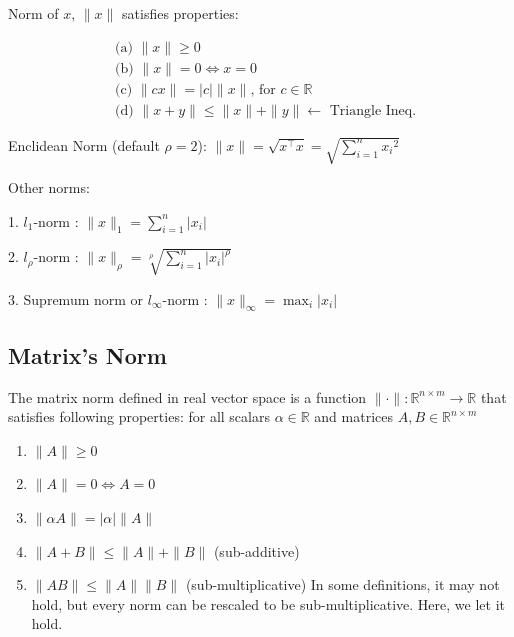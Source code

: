 \documentclass[11pt]{elegantbook}
\begin{document}
Norm of $x$, $\|x\|$ satisfies properties:

$$
\begin{aligned}
&\text { (a) }\|x\| \geqslant 0 \\
&\text { (b) }\|x\|=0 \Leftrightarrow x=0 \\
&\text { (c) }\|c x\|=|c|\|x\| \text {, for } c \in \mathbb{R} \\
&\text { (d) }\|x+y\| \leqslant\|x\|+\|y\| \longleftarrow \text { Triangle Ineq. }
\end{aligned}
$$

Enclidean Norm (default $\rho=2$): $\|x\|=\sqrt{x^{\top} x}=\sqrt{\sum_{i=1}^{n} x_{i}{ }^{2}}$

Other norms:

1. $l_{1}$-norm : $\|x\|_{1}=\sum_{i=1}^{n}\left|x_{i}\right|$

2. $l_{\rho}$-norm : $\|x\|_{\rho}=\sqrt[\rho]{\sum_{i=1}^{n}\left|x_{i}\right|^\rho}$

3. Supremum norm or $l_{\infty}$-norm : $\|x\|_{\infty}=\max _{i}\left|x_{i}\right|$


\subsection{Matrix's Norm}
\begin{definition}
\normalfont
    The matrix norm defined in real vector space is a function $\|\cdot\|: \mathbb{R}^{n\times m} \rightarrow \mathbb{R}$ that satisfies following properties: for all scalars $\alpha\in \mathbb{R}$ and matrices $A,B\in \mathbb{R}^{n\times m}$
    \begin{enumerate}[(1).]
        \item $\|A\|\geq 0$
        \item $\|A\|=0 \Leftrightarrow A=0$
        \item $\|\alpha A\|=|\alpha|\|A\|$
        \item $\|A+B\|\leq\|A\|+\|B\|$ (sub-additive)
        \item $\|AB\|\leq \|A\|\|B\|$ (sub-multiplicative)
        \subitem In some definitions, it may not hold, but every norm can be rescaled to be sub-multiplicative. Here, we let it hold.
    \end{enumerate}
\end{definition}
\end{document}

